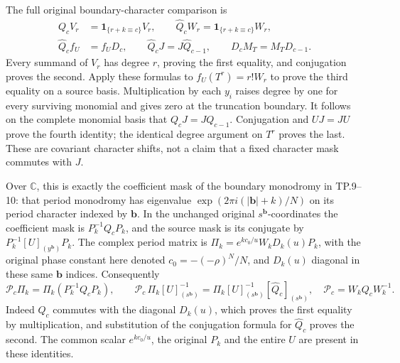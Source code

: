 The full original boundary-character comparison is
\[
 \begin{split}
 Q_c V_r&=\mathbf 1_{\{r+k\equiv c\}}V_r,\qquad
 \widehat Q_c W_r=\mathbf 1_{\{r+k\equiv c\}}W_r,\\
 \widehat Q_c f_U&=f_U D_c,\qquad
 \widehat Q_c J=J\widehat Q_{c-1},\qquad
 D_c M_T=M_TD_{c-1}.
 \end{split}
 \tag{TCL.30}\label{CFStage:eq:tcl-character-diagram}
\]
Every summand of \(V_r\) has degree \(r\), proving the first
equality, and conjugation proves the second. Apply these formulas
to \(f_U(T^r)=r!W_r\) to prove the third equality on a source
basis. Multiplication by each \(y_i\) raises degree by one for
every surviving monomial and gives zero at the truncation boundary.
It follows on the complete monomial basis that
\(Q_cJ=JQ_{c-1}\). Conjugation and \(UJ=JU\) prove the fourth
identity; the identical degree argument on \(T^r\) proves the
last. These are covariant character shifts, not a claim that a
fixed character mask commutes with \(J\).

Over \(\mathbb C\), this is exactly the coefficient mask of
the boundary monodromy in TP.9--10: that period monodromy has
eigenvalue \(\exp(2\pi i(|\mathbf b|+k)/N)\) on its period
character indexed by \(\mathbf b\). In the unchanged original
\(s^{\mathbf b}\)-coordinates the coefficient mask is
\(P_k^{-1}Q_cP_k\), and the source mask is its conjugate by
\(P_k^{-1}[U]_{(y^{\mathbf b})}P_k\). The complex period matrix
is \(\Pi_k=e^{kc_0/u}W_kD_k(u)P_k\), with the original phase
constant here denoted \(c_0=-(-\rho)^N/N\), and \(D_k(u)\)
diagonal in these same \(\mathbf b\) indices. Consequently
\[
 \mathcal P_c\Pi_k=\Pi_k(P_k^{-1}Q_cP_k),\qquad
 \mathcal P_c\,\Pi_k[U]_{(s^{\mathbf b})}^{-1}
   =\Pi_k[U]_{(s^{\mathbf b})}^{-1}
                [\widehat Q_c]_{(s^{\mathbf b})},
 \quad \mathcal P_c=W_kQ_cW_k^{-1}.
 \tag{TCL.31}\label{CFStage:eq:tcl-period-mask}
\]
Indeed \(Q_c\) commutes with the diagonal \(D_k(u)\), which
proves the first equality by multiplication, and substitution of
the conjugation formula for \(\widehat Q_c\) proves the second.
The common scalar \(e^{kc_0/u}\), the original \(P_k\) and the
entire \(U\) are present in these identities.

